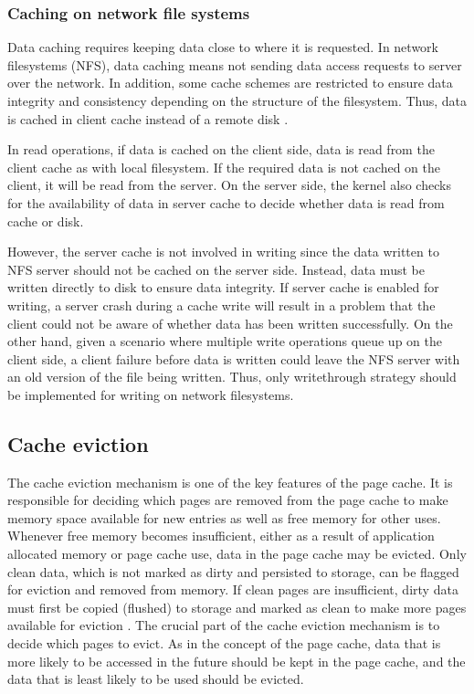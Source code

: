\subsubsection{Caching on network file systems}

Data caching requires keeping data close to where it is requested. 
In network filesystems (NFS), data caching means not sending data access 
requests to server over the network. 
In addition, some cache schemes are restricted to ensure data integrity and 
consistency depending on the structure of the filesystem.
Thus, data is cached in client cache instead of a remote disk 
\cite{eisler2001managing}. 

In read operations, if data is cached on the client side, data is read from the 
client cache as with local filesystem. If the required data is not cached on the 
client, it will be read from the server. On the server side, the kernel also checks 
for the availability of data in server cache to decide whether data is read from 
cache or disk. 

However, the server cache is not involved in writing since the data 
written to NFS server should not be cached on the server side. 
Instead, data must be written directly to disk to ensure data integrity.
If server cache is enabled for writing, a server crash during a cache 
write will result in a problem that the client could not be aware of whether 
data has been written successfully. 
On the other hand, given a scenario where multiple write operations queue up 
on the client side, a client failure before data is written could leave the NFS 
server with an old version of the file being written. 
Thus, only writethrough strategy should be implemented for writing on 
network filesystems. 

\subsection{Cache eviction}

The cache eviction mechanism is one of the key features of the
page cache. 
It is responsible for deciding which pages are removed from the 
page cache to make memory space available for new entries as well as 
free memory for other uses. 
Whenever free memory becomes insufficient, either as a result of application 
allocated memory or page cache use, data in the page cache may be evicted. 
Only clean data, which is not marked as dirty and persisted to storage, 
can be flagged for eviction and removed from memory. 
If clean pages are insufficient, dirty data must first be copied (flushed) 
to storage and marked as clean to make more pages available for eviction 
\cite{linuxdev3rd2010,bovet2005understanding}. 
The crucial part of the cache eviction mechanism is to decide which pages 
to evict. As in the concept of the page cache, data that is more likely 
to be accessed in the future should be kept in the page cache, and the data 
that is least likely to be used should be evicted. 

